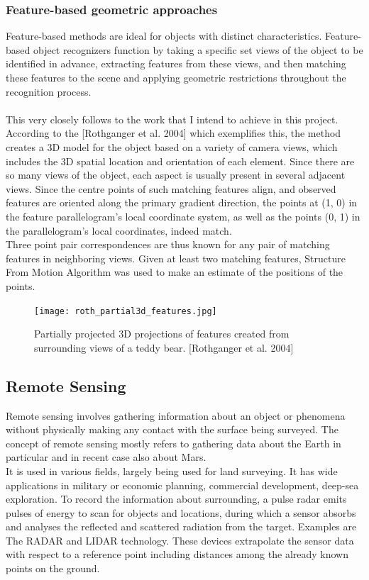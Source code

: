 \documentclass[a4paper]{report}
\begin{document}
\subsubsection{Feature-based geometric approaches}
Feature-based methods are ideal for objects with distinct characteristics.
Feature-based object recognizers function by taking a specific set views of the object to be identified in advance, extracting features from these views, and then matching these features to the scene and applying geometric restrictions throughout the recognition process.
\\
\\
This very closely follows to the work that I intend to achieve in this project. According to the [Rothganger et al. 2004] which exemplifies this, the method creates a 3D model for the object based on a variety of camera views, which includes the 3D spatial location and orientation of each element. Since there are so many views of the object, each aspect is usually present in several adjacent views. Since the centre points of such matching features align, and observed features are oriented along the primary gradient direction, the points at (1, 0) in the feature parallelogram's local coordinate system, as well as the points (0, 1) in the parallelogram's local coordinates, indeed match. \\
Three point pair correspondences are thus known for any pair of matching features in neighboring views. Given at least two matching features, Structure From Motion Algorithm was used to make an estimate of the positions of the points.
\begin{figure}[h]
\texttt{[image: roth\_partial3d\_features.jpg]} 
\caption{Partially projected 3D projections of features created from surrounding views of a teddy bear. [Rothganger et al. 2004] }
\end{figure}
\newpage

\subsection{Remote Sensing}
Remote sensing involves gathering information about an object or phenomena without physically making any contact with the surface being surveyed. The concept of remote sensing mostly refers to gathering data about the Earth in particular and in recent case also about Mars.
\\
It is used in various fields, largely being used for land surveying. It has wide applications in military or economic planning, commercial development, deep-sea exploration. To record the information about surrounding, a pulse radar emits pulses of energy to scan for objects and locations, during which a sensor absorbs and analyses the reflected and scattered radiation from the target. Examples are The RADAR and LIDAR technology. These devices extrapolate the sensor data with respect to a reference point including distances among the already known points on the ground. 
\\
\end{document}
